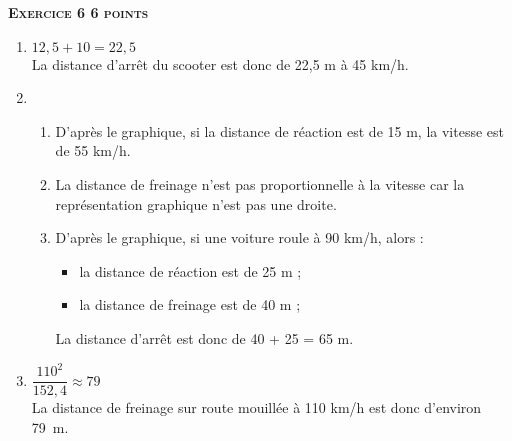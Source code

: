 \textbf{\textsc{Exercice 6 \hfill 6 points}}

\medskip

\begin{enumerate}
  \item $12,5 + 10 = 22,5$\\
  La distance d'arrêt du scooter est donc de 22,5 m à 45 km/h.
  \item
  \begin{enumerate}
    \item D'après le graphique, si la distance de réaction est de 15 m, la vitesse est de 55 km/h.
    \item La distance de freinage n'est pas proportionnelle à la vitesse car la représentation graphique n'est pas une droite.
    \item D'après le graphique, si une voiture roule à 90 km/h, alors :
    \begin{itemize}
      \item la distance de réaction est de 25 m ;
      \item la distance de freinage est de 40 m ;
    \end{itemize}
    La distance d'arrêt est donc de 40 + 25 = 65 m.
  \end{enumerate}
  \item $\dfrac{110^2}{152,4} \approx 79$\\
  La distance de freinage sur route mouillée à 110 km/h est donc d'environ 79~m.
\end{enumerate}

\medskip


